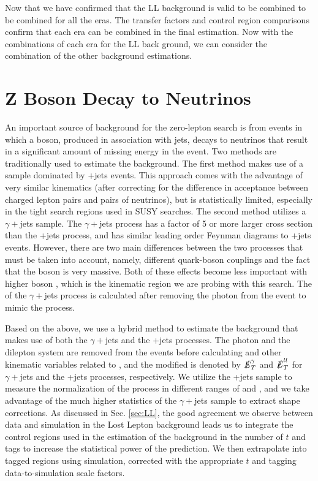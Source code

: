 Now that we have confirmed that the LL background is valid to be combined to be combined for all the eras. The transfer factors and control region comparisons confirm that each era can be combined in the final estimation. Now with the combinations of each era for the LL back ground, we can consider the combination of the other background estimations. 

\section{Z Boson Decay to Neutrinos}
\label{sec:Znunu}

An important source of background for the zero-lepton search is from events in which a \Z{} boson, produced in association with jets, decays to neutrinos that result in a significant amount of missing energy in the event. Two methods are traditionally used to estimate the \Znunu{} background. The first method makes use of a sample dominated by \Zll+jets events. This approach comes with the advantage of very similar kinematics (after correcting for the difference in acceptance between charged lepton pairs and pairs of neutrinos), but is statistically limited, especially in the tight search regions used in SUSY searches. The second method utilizes a $\gamma+$jets sample. The $\gamma+$jets process has a factor of 5 or more larger cross section than the \Zll+jets process, and has similar leading order Feynman diagrams to \Z+jets events. However, there are two main differences between the two processes that must be taken into account, namely, different quark-boson couplings and the fact that the \Z{} boson is very massive. Both of these effects become less important with higher boson \pt, which is the kinematic region we are probing with this search. The \met{} of the $\gamma+$jets process is calculated after removing the photon from the event to mimic the \Znunu{} process.

Based on the above, we use a hybrid method to estimate the \Znunu{} background that makes use of both the $\gamma+$jets and the \Zll+jets processes. The photon and the dilepton system are removed from the events before calculating \met{} and other kinematic variables related to \met, and the modified \met{} is denoted by $\slashed{E}_{T}^\gamma$ and $\slashed{E}_{T}^{ll}$ for $\gamma+$jets and the \Zll+jets processes, respectively. We utilize the \Zll+jets sample to measure the normalization of the \Znunu{} process in different ranges of \nb{} and \nsv, and we take advantage of the much higher statistics of the $\gamma+$jets sample to extract shape corrections. As discussed in Sec. \ref{sec:LL}, the good agreement we observe between data and simulation in the Lost Lepton background leads us to integrate the control regions used in the estimation of the \Znunu{} background in the number of $t$ and \W{} tags to increase the statistical power of the prediction. We then extrapolate into tagged regions using simulation, corrected with the appropriate $t$ and \W{} tagging data-to-simulation scale factors.

